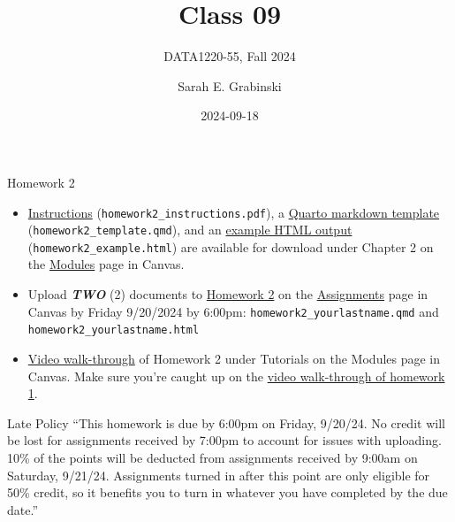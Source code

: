 \documentclass[
  ignorenonframetext,
]{beamer}
\title{Class 09}
\subtitle{DATA1220-55, Fall 2024}
\author{Sarah E. Grabinski}
\date{2024-09-18}
\begin{document}
\frame{\titlepage}

\begin{frame}[fragile]{Homework 2}
\label{homework-2}
\begin{itemize}
\item
  \href{https://canvas.jcu.edu/files/3708401/download?download_frd=1}{Instructions}
  (\texttt{homework2\_instructions.pdf}), a
  \href{https://canvas.jcu.edu/files/3708307/download?download_frd=1}{Quarto
  markdown template} (\texttt{homework2\_template.qmd}), and an
  \href{https://canvas.jcu.edu/files/3708306/download?download_frd=1}{example
  HTML output} (\texttt{homework2\_example.html}) are available for
  download under Chapter 2 on the
  \href{https://canvas.jcu.edu/courses/36290/modules}{Modules} page in
  Canvas.
\item
  Upload \textbf{\emph{TWO}} (2) documents to
  \href{https://canvas.jcu.edu/courses/36290/assignments/451733}{Homework
  2} on the
  \href{https://canvas.jcu.edu/courses/36290/assignments}{Assignments}
  page in Canvas by Friday 9/20/2024 by 6:00pm:
  \texttt{homework2\_yourlastname.qmd} and
  \texttt{homework2\_yourlastname.html}
\item
  \href{https://canvas.jcu.edu/files/3708369/download?download_frd=1}{Video
  walk-through} of Homework 2 under Tutorials on the Modules page in
  Canvas. Make sure you're caught up on the
  \href{https://canvas.jcu.edu/files/3695568/download?download_frd=1}{video
  walk-through of homework 1}.
\end{itemize}
\end{frame}

\begin{frame}{Late Policy}
\label{late-policy}
``This homework is due by 6:00pm on Friday, 9/20/24. No credit will be
lost for assignments received by 7:00pm to account for issues with
uploading. 10\% of the points will be deducted from assignments received
by 9:00am on Saturday, 9/21/24. Assignments turned in after this point
are only eligible for 50\% credit, so it benefits you to turn in
whatever you have completed by the due date.''
\end{frame}
\end{document}

